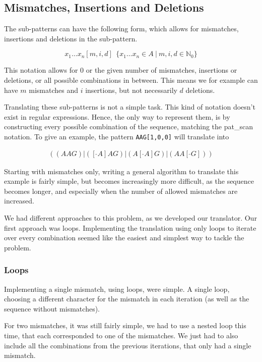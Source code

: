 \documentclass[12pt]{article}
\begin{document}
\subsection{Mismatches, Insertions and Deletions}

The sub-patterns can have the following form, which allows for mismatches, insertions and deletions in the sub-pattern. 

\begin{equation}
	x_1 \ldots x_n[m, i, d] \ \ \{ x_1 \ldots x_n \in A \ | \ m, i, d \in \mathbb{N}_0 \}
\end{equation} 

This notation allows for 0 or the given number of mismatches, insertions or deletions, or all possible combinations in between. This means we for example can have $m$ mismatches and $i$ insertions, but not necessarily $d$ deletions.

Translating these sub-patterns is not a simple task. This kind of notation doesn't exist in regular expressions. Hence, the only way to represent them, is by constructing every possible combination of the sequence, matching the pat\_scan notation. To give an example, the pattern \texttt{AAG[1,0,0]} will translate into

\begin{eqnarray}
	((AAG)|([\ \hat{}A]AG)|(A[\ \hat{}A]G)|(AA[\ \hat{}G]))
\end{eqnarray}

Starting with mismatches only, writing a general algorithm to translate this example is fairly simple, but becomes increasingly more difficult, as the sequence becomes longer, and especially when the number of allowed mismatches are increased.

We had different approaches to this problem, as we developed our translator. Our first approach was loops. Implementing the translation using only loops to iterate over every combination seemed like the easiest and simplest way to tackle the problem.

\subsubsection{Loops}

Implementing a single mismatch, using loops, were simple. A single loop, choosing a different character for the mismatch in each iteration (as well as the sequence without mismatches).

For two mismatches, it was still fairly simple, we had to use a nested loop this time, that each corresponded to one of the mismatches. We just had to also include all the combinations from the previous iterations, that only had a single mismatch.
\end{document}
